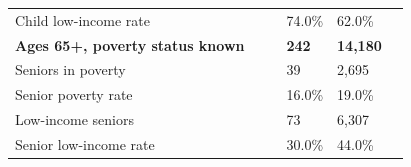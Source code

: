 \documentclass[9pt]{report}
\begin{document}
\begin{tabular}{p{.10in}p{.10in}p{.10in}p{3.7in}>{\hfill}p{.85in}>{\hfill}p{.85in}>{\hfill}p{.85in}>{\hfill}p{.85in}p{0.1in}}
\multicolumn{4}{l}{\parbox{3.6in}{\strut\raggedright{{Child low-income rate}}\strut}} &  &  & 74.0\% & 62.0\% & \multicolumn{1}{l}{}  \\ 
\multicolumn{4}{l}{\parbox{3.5in}{\strut\raggedright{\textbf{Ages 65+, poverty status known}\strut}}} & \textbf{} & \textbf{} & \textbf{242} & \textbf{14,180} & \textbf{} \\ 
\multicolumn{4}{l}{\parbox{3.6in}{\strut\raggedright{{Seniors in poverty}}\strut}} &  &  & 39 & 2,695 & \multicolumn{1}{l}{}  \\ 
\multicolumn{4}{l}{\parbox{3.6in}{\strut\raggedright{{Senior poverty rate}}\strut}} &  &  & 16.0\% & 19.0\% & \multicolumn{1}{l}{}  \\ 
\multicolumn{4}{l}{\parbox{3.6in}{\strut\raggedright{{Low-income seniors}}\strut}} &  &  & 73 & 6,307 & \multicolumn{1}{l}{}  \\ 
\multicolumn{4}{l}{\parbox{3.6in}{\strut\raggedright{{Senior low-income rate}}\strut}} &  &  & 30.0\% & 44.0\% & \multicolumn{1}{l}{}  \\ 

\end{tabular}
\setlength{\tabcolsep}{6pt} %
\end{document}
